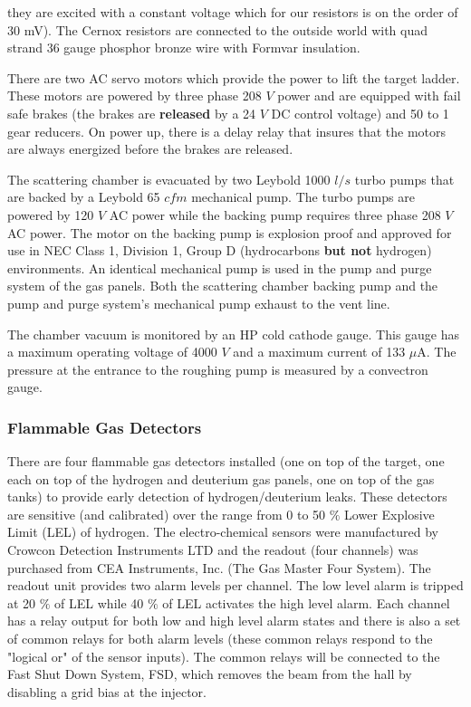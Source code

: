 \begin{safetyen}{10}{5}
{\begin{description}
they are excited with a constant voltage which for our resistors is
on the order of 30 mV). The Cernox resistors are connected to the outside world
with quad strand 36 gauge phosphor bronze wire with Formvar insulation.
\item[{\bf Target Lifter}] There are two AC servo motors which provide
the power to lift the target ladder. These motors are powered by three
phase 208 $V$ power and are equipped with fail safe brakes (the brakes are
{\bf released} by a 24 $V$ DC control voltage)
and 50 to 1 gear reducers. On power up, there is a delay relay
that insures that
the motors are always energized before the brakes are released.
\item[{\bf Vacuum Pumps}] The scattering chamber is evacuated by two Leybold
1000 $l/s$ turbo pumps that are  backed by a Leybold 65 $cfm$
mechanical pump. The turbo pumps are powered by 120 $V$ AC power while the
backing pump requires three phase 208 $V$ AC power. The motor on the backing 
pump is explosion proof and approved for use in NEC Class 1, Division 1,
Group D (hydrocarbons {\bf but not} hydrogen) environments. An identical
mechanical pump is used in the pump and purge system of the gas panels.
Both the scattering chamber backing pump and the
pump and purge system's mechanical pump exhaust to the vent line. 
\item[{\bf Vacuum Gauges}] The chamber vacuum is monitored by an
HP cold cathode gauge. This gauge has a maximum operating voltage of 
4000 $V$ and a maximum
current of 133 $\mu$A. The pressure at the entrance to the roughing pump
is measured by a convectron gauge.
\end{description}
}

\subsubsection{ Flammable Gas Detectors}

There are four flammable gas detectors installed (one on top of the target,
one each on top of the hydrogen and deuterium gas panels, one on top of the gas
tanks)
to provide early detection
of hydrogen/deuterium leaks. These detectors are sensitive (and calibrated)
over the range from 0 to 50 $\%$ Lower Explosive Limit (LEL) of hydrogen.
The electro-chemical sensors were manufactured by Crowcon Detection
Instruments LTD and
the readout (four channels) was purchased from CEA Instruments, Inc. 
(The Gas Master Four System). The readout unit provides two alarm
levels per channel. The low level alarm is tripped at 20 $\%$ of LEL
while 40 $\%$ of LEL activates the high level alarm.
Each channel has a relay output for both low and high level alarm
states and there is also a set of common relays for both alarm
levels (these common relays respond to the "logical or" of the sensor inputs).
The common relays will be connected to the Fast Shut Down System, FSD,
which removes the beam from the hall by disabling a grid bias at the
injector.
\end{safetyen}

